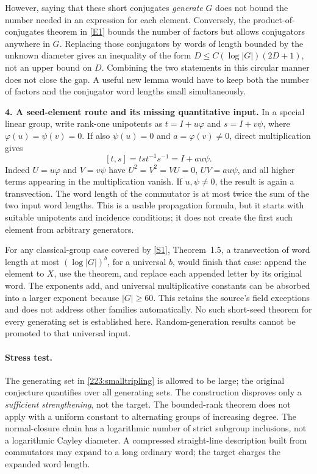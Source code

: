 \documentclass[11pt,a4paper]{article}
\newcommand{\sref}[2]{\hyperlink{source:#1:#2}{[S#2]}}
\newcommand{\eref}[2]{\hyperlink{extra:#1:#2}{[E#2]}}
\numberwithin{equation}{section}
\begin{document}
However, saying that these short conjugates \emph{generate} $G$ does
not bound the number needed in an expression for each element.
Conversely, the product-of-conjugates theorem in \eref{223}{1} bounds
the number of factors but allows conjugators anywhere in $G$.
Replacing those conjugators by words of length bounded by the unknown
diameter gives an inequality of the form
$D\le C(\log|G|)(2D+1)$, not an upper bound on $D$.
Combining the two statements in this circular manner does not close the
gap. A useful new lemma would have to keep both the number of factors
and the conjugator word lengths small simultaneously.

\textbf{4. A seed-element route and its missing quantitative input.}
In a special linear group, write rank-one unipotents as
$t=I+u\varphi$ and $s=I+v\psi$, where
$\varphi(u)=\psi(v)=0$. If also $\psi(u)=0$ and
$a=\varphi(v)\ne0$, direct multiplication gives
\begin{equation}\label{223:commutator}
 [t,s]=tst^{-1}s^{-1}=I+a u\psi.
\end{equation}
Indeed $U=u\varphi$ and $V=v\psi$ have $U^2=V^2=VU=0$,
$UV=a u\psi$, and all higher terms appearing in the multiplication
vanish. If $u,\psi\ne0$, the result is again a transvection.
The word length of the commutator is at most twice the sum of the two
input word lengths. This is a usable propagation formula, but it starts
with suitable unipotents and incidence conditions; it does not create
the first such element from arbitrary generators.

For any classical-group case covered by \sref{223}{1}, Theorem~1.5,
a transvection of word length at most $(\log|G|)^b$, for a universal
$b$, would finish that case: append the element to $X$, use the theorem,
and replace each appended letter by its original word. The exponents
add, and universal multiplicative constants can be absorbed into a
larger exponent because $|G|\ge60$. This retains the source's field
exceptions and does not address other families automatically.
No such short-seed theorem for every generating set is established here.
Random-generation results cannot be promoted to that universal input.

\paragraph{Stress test.}
The generating set in \eqref{223:smalltripling} is allowed to be large;
the original conjecture quantifies over all generating sets. The
construction disproves only a \emph{sufficient strengthening}, not the
target. The bounded-rank theorem does not apply with a uniform constant
to alternating groups of increasing degree. The normal-closure chain
has a logarithmic number of strict subgroup inclusions, not a logarithmic
Cayley diameter. A compressed straight-line description built from
commutators may expand to a long ordinary word; the target charges the
expanded word length.
\end{document}
